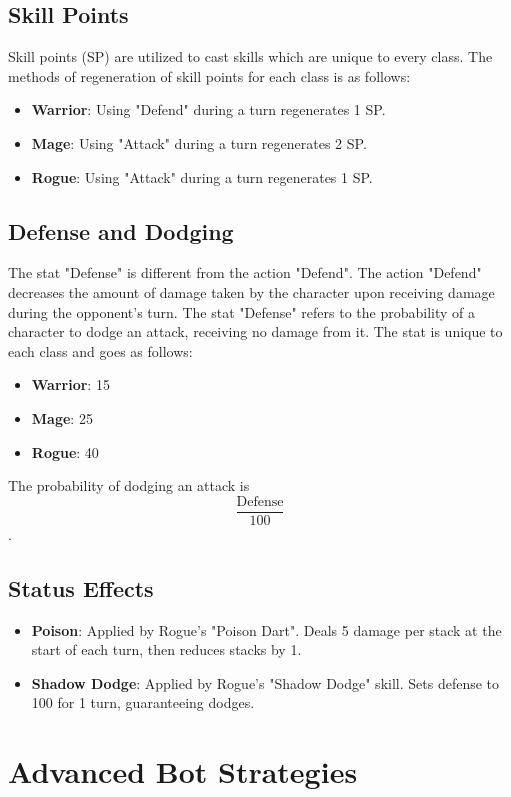 \documentclass[12pt]{article}
\begin{document}
\subsection{Skill Points}
Skill points (SP) are utilized to cast skills which are unique to every class. The methods of regeneration of skill points for each class is as follows:
\begin{itemize}
    \item \textbf{Warrior}: Using "Defend" during a turn regenerates 1 SP.
    \item \textbf{Mage}: Using "Attack" during a turn regenerates 2 SP.
    \item \textbf{Rogue}: Using "Attack" during a turn regenerates 1 SP.
\end{itemize}

\subsection{Defense and Dodging}
The stat "Defense" is different from the action "Defend". The action "Defend" decreases the amount of damage taken by the character upon receiving damage during the opponent's turn. The stat "Defense" refers to the probability of a character to dodge an attack, receiving no damage from it. The stat is unique to each class and goes as follows:
\begin{itemize}
    \item \textbf{Warrior}: 15
    \item \textbf{Mage}: 25
    \item \textbf{Rogue}: 40
\end{itemize}
The probability of dodging an attack is $$\frac{\text{Defense}}{100}$$.

\subsection{Status Effects}
\begin{itemize}
    \item \textbf{Poison}: Applied by Rogue's "Poison Dart". Deals 5 damage per stack at the start of each turn, then reduces stacks by 1.
    \item \textbf{Shadow Dodge}: Applied by Rogue's "Shadow Dodge" skill. Sets defense to 100 for 1 turn, guaranteeing dodges.
\end{itemize}

\section{Advanced Bot Strategies}
\label{sec:advanced}
\end{document}
